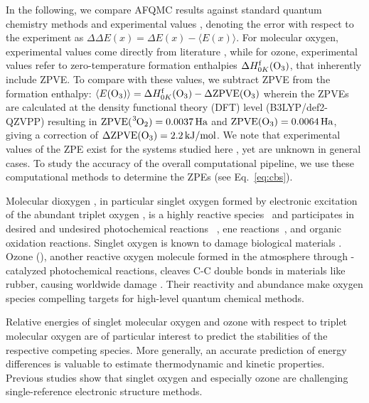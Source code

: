 \documentclass[../main.tex]{subfiles}
\begin{document}
In the following, we compare AFQMC results against standard quantum chemistry methods and experimental values \cite{krupenie1972spectrum, weast1983}, denoting the error with respect to the experiment as $\Delta\Delta E(x)=\Delta E(x)-\langle E(x) \rangle$. For molecular oxygen, experimental values come directly from literature \cite{krupenie1972spectrum}, while for ozone, experimental values refer to zero-temperature formation enthalpies $\Delta H^{\mathrm f}_{0K}(\ce{O_3})$, \cite{weast1983} that inherently include \ac{ZPVE}. To compare with these values, we subtract ZPVE from the formation enthalpy: $\langle E(\ce{O_3}) \rangle = \Delta H^{\mathrm f}_{0K}(\ce{O_3}) - \Delta \mathrm{ZPVE}(\ce{O_3}) $ wherein the ZPVEs are calculated at the density functional theory (DFT) level (B3LYP/def2-QZVPP) resulting in $\mathrm{ZPVE}(\ce{^3O_2})=0.0037 \,  \mathrm{Ha}$ and $\mathrm{ZPVE}(\ce{O_3})=0.0064 \, \mathrm{Ha}$, giving a correction of $\Delta \mathrm{ZPVE}(\ce{O_3}) = 2.2 \,  \mathrm{kJ/mol}$. We note that experimental values of the ZPE exist for the systems studied here \cite{feller2008survey}, yet are unknown in general cases. To study the accuracy of the overall computational pipeline,  we use these computational methods to determine the ZPEs (see Eq.~\ref{eq:cbs}). 

Molecular dioxygen , in particular singlet oxygen  formed by electronic excitation of the abundant triplet oxygen , is a highly reactive species~\cite{Sagadevan2017hydrocarbons, Norbert2008chemrevphotochem} and participates in desired and undesired photochemical reactions ~\cite{Norbert2008chemrevphotochem,Pibiri2018o2chem,Claude2003singletoxygen}, ene reactions~\cite{Daniel2003Ene-reactions}, and organic oxidation reactions. Singlet oxygen is known to damage biological materials \cite{Triantaphylides2008, Davies2003}.
Ozone (), another reactive oxygen molecule formed in the atmosphere through -catalyzed photochemical reactions, cleaves C-C double bonds in materials like rubber, causing worldwide damage \cite{Lewis1986}. Their reactivity and abundance make oxygen species compelling targets for high-level quantum chemical methods.

Relative energies of singlet molecular oxygen and ozone with respect to triplet molecular oxygen are of particular interest to predict the stabilities of the respective competing species. More generally, an accurate prediction of energy differences is valuable to estimate thermodynamic and kinetic properties.
Previous studies \cite{Onishi2018Oxygen,Aleksandr2022CEJ,GRAFENSTEIN1998593,Siebert2001ozone,Holka2010ozone,Dawes2011ozone,Dawes2013ozone} show that singlet oxygen and especially ozone are challenging single-reference electronic structure methods.
\end{document}
